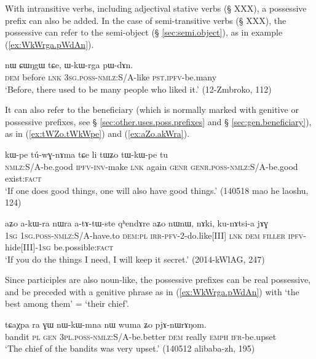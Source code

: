 With intransitive verbs, including adjectival stative verbs (§ XXX), a possessive prefix can also be added. In the case of semi-transitive verbs (§ XXX), the possessive can refer to the semi-object (§ \ref{sec:semi.object}), as in example (\ref{ex:WkWrga.pWdAn}).

 \begin{exe} 
\ex \label{ex:WkWrga.pWdAn}
\gll  nɯ ɕɯŋgɯ tɕe, ɯ-kɯ-rga pɯ-dɤn. \\
\textsc{dem} before \textsc{lnk} \textsc{3sg}.\textsc{poss}-\textsc{nmlz}:S/A-like \textsc{pst}.\textsc{ipfv}-be.many \\
\glt  `Before, there used to be many people who liked it.' (12-Zmbroko, 112)
\end{exe}

It can also refer to the beneficiary (which is normally marked with genitive or possessive prefixes, see § \ref{sec:other.uses.poss.prefixes} and § \ref{sec:gen.beneficiary}), as in (\ref{ex:tWZo.tWkWpe}) and (\ref{ex:aZo.akWra}).

 \begin{exe} 
\ex \label{ex:tWZo.tWkWpe}
\gll  kɯ-pe tú-wɣ-nɤma tɕe li tɯʑo tɯ-kɯ-pe tu \\
\textsc{nmlz}:S/A-be.good \textsc{ipfv}-\textsc{inv}-make \textsc{lnk} again \textsc{genr} \textsc{genr}.\textsc{poss}-\textsc{nmlz}:S/A-be.good exist:\textsc{fact} \\
\glt  `If one does good things, one will also have good things.' (140518 mao he laoshu, 124)
\end{exe}

 \begin{exe} 
\ex \label{ex:aZo.akWra}
\gll  aʑo a-kɯ-ra nɯra a-tɤ-tɯ-ste qʰendɤre aʑo nɯnɯ, nɤki, ku-nɤtsi-a jɤɣ \\
\textsc{1sg} \textsc{1sg}.\textsc{poss}-\textsc{nmlz}:S/A-have.to \textsc{dem}:\textsc{pl} \textsc{irr}-\textsc{pfv}-2-do.like[III] \textsc{lnk} \textsc{dem} \textsc{filler} \textsc{ipfv}-hide[III]-\textsc{1sg} be.possible:\textsc{fact}  \\
\glt  `If you do the things I need, I will keep it secret.'  (2014-kWlAG, 247)
\end{exe}

Since participles are also noun-like, the possessive prefixes can be real possessive, and be preceded with a genitive phrase as in (\ref{ex:WkWrga.pWdAn}) with  `the best among them' = `their chief'.

 \begin{exe} 
\ex \label{ex:WkWrga.pWdAn}
\gll tɕaχpa ra ɣɯ nɯ-kɯ-mna nɯ wuma ʑo pjɤ-nɯrɤŋom. \\
bandit \textsc{pl} \textsc{gen} \textsc{3pl}.\textsc{poss}-\textsc{nmlz}:S/A-be.better \textsc{dem} really \textsc{emph} \textsc{ifr}-be.upset \\
\glt `The chief of the bandits was very upset.' (140512 alibaba-zh, 195)
\end{exe}

